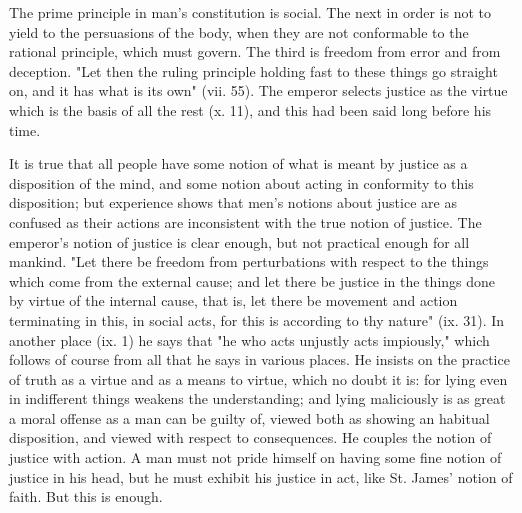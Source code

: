 The prime principle in man's constitution is social. The next in order is not to yield to the persuasions of the body, when they are not conformable to the rational principle, which must govern. The third is freedom from error and from deception. "Let then the ruling principle holding fast to these things go straight on, and it has what is its own" (vii. 55). The emperor selects justice as the virtue which is the basis of all the rest (x. 11), and this had been said long before his time.

It is true that all people have some notion of what is meant by justice as a disposition of the mind, and some notion about acting in conformity to this disposition; but experience shows that men's notions about justice are as confused as their actions are inconsistent with the true notion of justice. The emperor's notion of justice is clear enough, but not practical enough for all mankind. "Let there be freedom from perturbations with respect to the things which come from the external cause; and let there be justice in the things done by virtue of the internal cause, that is, let there be movement and action terminating in this, in social acts, for this is according to thy nature" (ix. 31). In another place (ix. 1) he says that "he who acts unjustly acts impiously," which follows of course from all that he says in various places. He insists on the practice of truth as a virtue and as a means to virtue, which no doubt it is: for lying even in indifferent things weakens the understanding; and lying maliciously is as great a moral offense as a man can be guilty of, viewed both as showing an habitual disposition, and viewed with respect to consequences. He couples the notion of justice with action. A man must not pride himself on having some fine notion of justice in his head, but he must exhibit his justice in act, like St. James' notion of faith. But this is enough.


